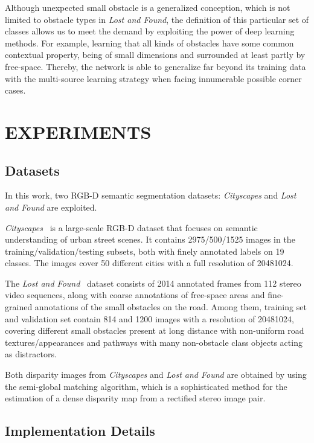 \documentclass[letterpaper, 10 pt, journal, twoside]{ieeetran}
\begin{document}
Although unexpected small obstacle is a generalized conception, which is not limited to obstacle types in \textit{Lost and Found}, the definition of this particular set of classes allows us to meet the demand by exploiting the power of deep learning methods. For example, learning that all kinds of obstacles have some common contextual property, being of small dimensions and surrounded at least partly by free-space. Thereby, the network is able to generalize far beyond its training data with the multi-source learning strategy when facing innumerable possible corner cases.





\section{EXPERIMENTS}

\subsection{Datasets}
In this work, two RGB-D semantic segmentation datasets: \textit{Cityscapes} and \textit{Lost and Found} are exploited.
 
\textit{Cityscapes}~\cite{Cordts2016Cityscapes} is a large-scale RGB-D dataset that focuses on semantic understanding of urban street scenes. It contains 2975/500/1525 images in the training/validation/testing subsets, both with finely annotated labels on 19 classes. The images cover 50 different cities with a full resolution of 20481024.
 
The \textit{Lost and Found}~\cite{pinggera2016lost} dataset consists of 2014 annotated frames from 112 stereo video sequences, along with coarse annotations of free-space areas and fine-grained annotations of the small obstacles on the road. Among them, training set and validation set contain 814 and 1200 images with a resolution of 20481024, covering different small obstacles present at long distance with non-uniform road textures/appearances and pathways with many non-obstacle class objects acting as distractors.
 
Both disparity images from \textit{Cityscapes} and \textit{Lost and Found} are obtained by using the semi-global matching algorithm\cite{hirschmuller2005accurate}, which is a sophisticated method for the estimation of a dense disparity map from a rectified stereo image pair.

\subsection{Implementation Details}
\end{document}
